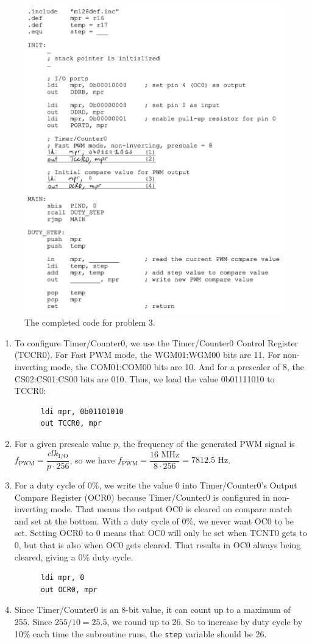 \documentclass[11pt]{article}
\begin{document}
\begin{enumerate}[leftmargin=0.2in]
  \begin{figure}[H]
    \centering
    \includegraphics[width=0.43\linewidth]{p3.png}
    \caption{The completed code for problem 3.}
    \label{fig:p3}
  \end{figure}

  \begin{enumerate}
    \item To configure Timer/Counter0, we use the Timer/Counter0 Control Register (TCCR0). For Fast PWM mode, the WGM01:WGM00 bits are 11. For non-inverting mode, the COM01:COM00 bits are 10. And for a prescaler of 8, the CS02:CS01:CS00 bits are 010. Thus, we load the value 0b01111010 to TCCR0:
      \begin{verbatim}
      ldi mpr, 0b01101010
      out TCCR0, mpr
      \end{verbatim}

    \item For a given prescale value $p$, the frequency of the generated PWM signal is $f_{\text{PWM}} = \dfrac{clk_{\text{I/O}}}{p\cdot 256}$, so we have $f_{\text{PWM}} = \dfrac{16\text{ MHz}}{8\cdot 256} = 7812.5\text{ Hz}$.

    \item For a duty cycle of 0\%, we write the value 0 into Timer/Counter0's Output Compare Register (OCR0) because Timer/Counter0 is configured in non-inverting mode. That means the output OC0 is cleared on compare match and set at the bottom. With a duty cycle of 0\%, we never want OC0 to be set. Setting OCR0 to 0 means that OC0 will only be set when TCNT0 gets to 0, but that is also when OC0 gets cleared. That results in OC0 always being cleared, giving a 0\% duty cycle.
      \begin{verbatim}
      ldi mpr, 0
      out OCR0, mpr
      \end{verbatim}

    \item Since Timer/Counter0 is an 8-bit value, it can count up to a maximum of 255. Since $255/10 = 25.5$, we round up to 26. So to increase by duty cycle by 10\% each time the subroutine runs, the \texttt{step} variable should be 26.
  \end{enumerate}


\end{enumerate}
\end{document}
